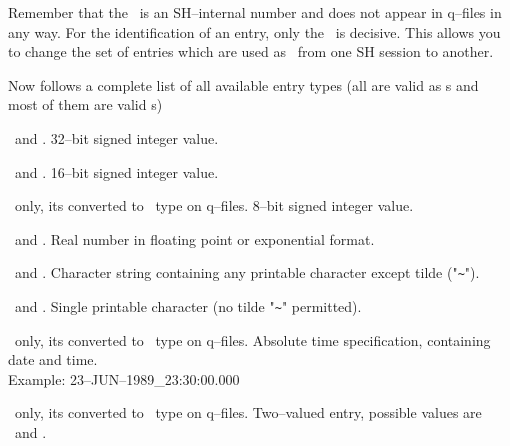 Remember that the \
is an SH--internal number and does not appear in q--files in
any way.  For the identification of an entry, only the
\ is decisive.  This allows you to change the set of
entries which are used as \shi{auto--load}\ from one SH session to
another.

Now follows a complete list of all available entry types
(all are valid as s and most of them are valid
s)
\begin{deflist}{}
\item[\sht{long}]  \ and .  32--bit signed 
             integer value.
\item[\sht{integer}]  \ and .
             16--bit signed integer value.
\item[\sht{byte}]  \ only, its converted to
             \ type on q--files.  8--bit signed integer
             value.
\item[\sht{real}]  \ and .  Real number
             in floating point or exponential format.
\item[\sht{string}]  \ and .  Character
             string containing any printable character except
             tilde ("\verb+~+").
\item[\sht{char}]  \ and .  Single
             printable character (no tilde "\verb+~+" permitted).
\item[\sht{time}]  \shi{sh--type}\ only, its converted to
             \ type on q--files.
             Absolute time specification, containing date and time.\\
             Example: 23--JUN--1989\_23:30:00.000
\item[\sht{flag}]  \ only, its converted to \
             type on q--files.  Two--valued entry, possible values
             are \exm{yes}\ and \exm{no}.
\end{deflist}

